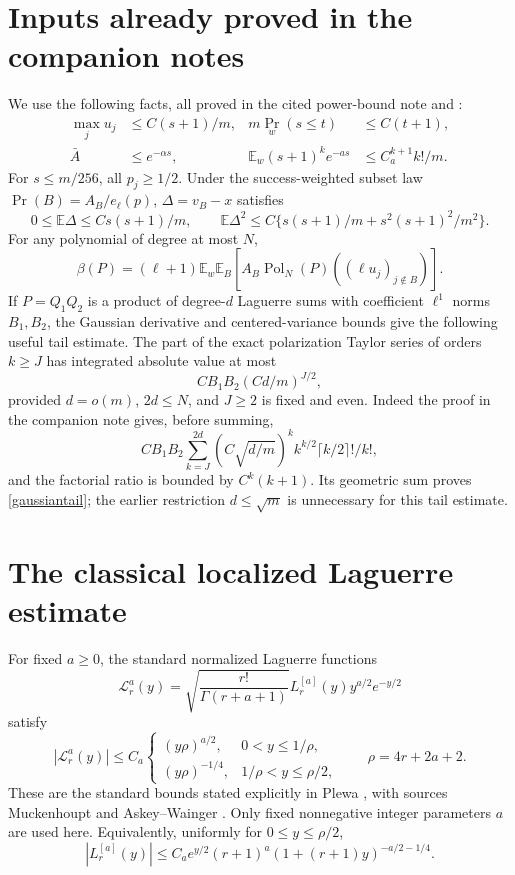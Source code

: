 \documentclass[11pt]{article}
\newcommand{\E}{\mathbb E}
\newcommand{\Pol}{\operatorname{Pol}}
\begin{document}
\section*{Inputs already proved in the companion notes}
We use the following facts, all proved in the cited power-bound note
and :
\begin{align}
 \max_j u_j&\le C(s+1)/m,&
 m\Pr_w(s\le t)&\le C(t+1),\label{inputs}\\
 \bar A&\le e^{-\alpha s},&
 \E_w(s+1)^k e^{-a s}&\le C_a^{k+1}k!/m.\label{inputs2}
\end{align}
For $s\le m/256$, all $p_j\ge1/2$. Under the success-weighted
subset law $\Pr(B)=A_B/e_\ell(p)$, $\Delta=v_B-x$ satisfies
\begin{equation}\label{weighted}
 0\le\E\Delta\le C s(s+1)/m,\qquad
 \E\Delta^2\le C\{s(s+1)/m+s^2(s+1)^2/m^2\}.
\end{equation}
For any polynomial of degree at most $N$,
\begin{equation}\label{exact}
 \beta(P)=(\ell+1)\E_w\E_B
           [A_B\Pol_N(P)((\ell u_j)_{j\notin B})].
\end{equation}
If $P=Q_1Q_2$ is a product of degree-$d$ Laguerre sums with coefficient
$\ell^1$ norms $B_1,B_2$, the Gaussian derivative and centered-variance
bounds give the following useful tail estimate. The part of the exact
polarization Taylor series of orders $k\ge J$ has integrated absolute
value at most
\begin{equation}\label{gaussiantail}
 C B_1B_2(Cd/m)^{J/2},
\end{equation}
provided $d=o(m)$, $2d\le N$, and $J\ge2$ is fixed and even.
Indeed the proof in the companion note gives, before summing,
\[
 C B_1B_2\sum_{k=J}^{2d}(C\sqrt{d/m})^k
       k^{k/2}\lceil k/2\rceil!/k!,
\]
and the factorial ratio is bounded by $C^k(k+1)$.
Its geometric sum proves \eqref{gaussiantail}; the earlier restriction
$d\le\sqrt m$ is unnecessary for this tail estimate.

\section*{The classical localized Laguerre estimate}
For fixed $a\ge0$, the standard normalized Laguerre functions
\[
 \mathcal L_r^a(y)=\sqrt{\frac{r!}{\Gamma(r+a+1)}}
                    L_r^{[a]}(y)y^{a/2}e^{-y/2}
\]
satisfy
\[
 |\mathcal L_r^a(y)|\le C_a
 \begin{cases}
 (y\rho)^{a/2},&0<y\le1/\rho,\\
 (y\rho)^{-1/4},&1/\rho<y\le\rho/2,
 \end{cases}
 \qquad\rho=4r+2a+2.
\tag{L}
\]
These are the standard bounds stated explicitly in Plewa
\cite[Section 2, immediately before (1)]{Plewa}, with sources
Muckenhoupt \cite[p.~435]{Muckenhoupt} and Askey--Wainger
\cite[p.~699]{AskeyWainger}. Only fixed nonnegative integer parameters
$a$ are used here. Equivalently, uniformly for $0\le y\le\rho/2$,
\begin{equation}\label{lagloc}
 |L_r^{[a]}(y)|\le C_a e^{y/2}(r+1)^a
                       (1+(r+1)y)^{-a/2-1/4}.
\end{equation}
\end{document}
